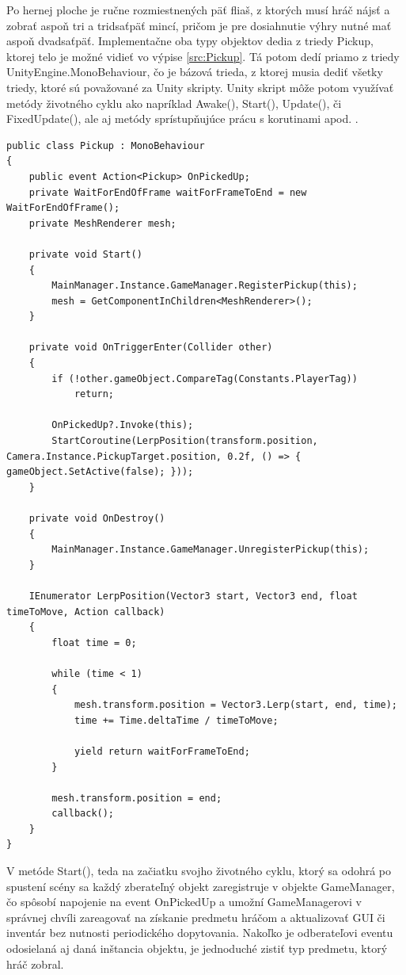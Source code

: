 \documentclass[slovak, master]{diploma}
\begin{document}
Po hernej ploche je ručne rozmiestnených päť fliaš, z ktorých musí hráč nájsť a zobrať aspoň tri a tridsaťpäť mincí, pričom je pre dosiahnutie výhry nutné mať aspoň dvadsaťpäť. Implementačne oba typy objektov dedia z triedy Pickup, ktorej telo je možné vidieť vo výpise \ref{src:Pickup}. Tá potom dedí priamo z triedy UnityEngine.MonoBehaviour, čo je bázová trieda, z ktorej musia dediť všetky triedy, ktoré sú považované za Unity skripty. Unity skript môže potom využívať metódy životného cyklu ako napríklad Awake(), Start(), Update(), či FixedUpdate(), ale aj metódy sprístupňujúce prácu s korutinami apod. \cite{MonoBehaviour}.
\vspace{8pt}
\begin{lstlisting}[label=src:Pickup,caption={Trieda Pickup slúžiaca ako predok všetkých zberateľných predmetov v hre}]
public class Pickup : MonoBehaviour
{
    public event Action<Pickup> OnPickedUp;
    private WaitForEndOfFrame waitForFrameToEnd = new WaitForEndOfFrame();
    private MeshRenderer mesh;

    private void Start() 
    {
        MainManager.Instance.GameManager.RegisterPickup(this);
        mesh = GetComponentInChildren<MeshRenderer>();
    }
    
    private void OnTriggerEnter(Collider other) 
    {
        if (!other.gameObject.CompareTag(Constants.PlayerTag)) 
            return;

        OnPickedUp?.Invoke(this);
        StartCoroutine(LerpPosition(transform.position, Camera.Instance.PickupTarget.position, 0.2f, () => { gameObject.SetActive(false); }));
    }
    
    private void OnDestroy() 
    {
        MainManager.Instance.GameManager.UnregisterPickup(this);
    }
    
    IEnumerator LerpPosition(Vector3 start, Vector3 end, float timeToMove, Action callback) 
    {
        float time = 0;

        while (time < 1)
        {
            mesh.transform.position = Vector3.Lerp(start, end, time);
            time += Time.deltaTime / timeToMove;

            yield return waitForFrameToEnd;
        }

        mesh.transform.position = end;
        callback();
    }
}
\end{lstlisting}

V metóde Start(), teda na začiatku svojho životného cyklu, ktorý sa odohrá po spustení scény sa každý zberateľný objekt zaregistruje v objekte GameManager, čo spôsobí napojenie na event OnPickedUp a umožní GameManagerovi v správnej chvíli zareagovať na získanie predmetu hráčom a aktualizovať GUI či inventár bez nutnosti periodického dopytovania. Nakoľko je odberateľovi eventu odosielaná aj daná inštancia objektu, je jednoduché zistiť typ predmetu, ktorý hráč zobral.
\end{document}
